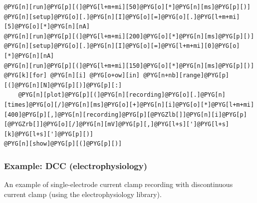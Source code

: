 \documentclass[letterpaper,10pt,english]{manual}
\begin{document}
\begin{Verbatim}[commandchars=@\[\]]
@PYG[n][run]@PYG[p][(]@PYG[l+m+mi][50]@PYG[o][*]@PYG[n][ms]@PYG[p][)]
@PYG[n][setup]@PYG[o][.]@PYG[n][I]@PYG[o][=]@PYG[o][.]@PYG[l+m+mi][5]@PYG[o][*]@PYG[n][nA]
@PYG[n][run]@PYG[p][(]@PYG[l+m+mi][200]@PYG[o][*]@PYG[n][ms]@PYG[p][)]
@PYG[n][setup]@PYG[o][.]@PYG[n][I]@PYG[o][=]@PYG[l+m+mi][0]@PYG[o][*]@PYG[n][nA]
@PYG[n][run]@PYG[p][(]@PYG[l+m+mi][150]@PYG[o][*]@PYG[n][ms]@PYG[p][)]
@PYG[k][for] @PYG[n][i] @PYG[o+ow][in] @PYG[n+nb][range]@PYG[p][(]@PYG[n][N]@PYG[p][)]@PYG[p][:]
    @PYG[n][plot]@PYG[p][(]@PYG[n][recording]@PYG[o][.]@PYG[n][times]@PYG[o][/]@PYG[n][ms]@PYG[o][+]@PYG[n][i]@PYG[o][*]@PYG[l+m+mi][400]@PYG[p][,]@PYG[n][recording]@PYG[p][@PYGZlb[]]@PYG[n][i]@PYG[p][@PYGZrb[]]@PYG[o][/]@PYG[n][mV]@PYG[p][,]@PYG[l+s][']@PYG[l+s][k]@PYG[l+s][']@PYG[p][)]
@PYG[n][show]@PYG[p][(]@PYG[p][)]
\end{Verbatim}

\resetcurrentobjects
\hypertarget{--doc-examples-electrophysiology_DCC}{}

\hypertarget{index-23}{}\subsubsection{Example: DCC (electrophysiology)}

An example of single-electrode current clamp recording
with discontinuous current clamp (using the electrophysiology library).
\end{document}
